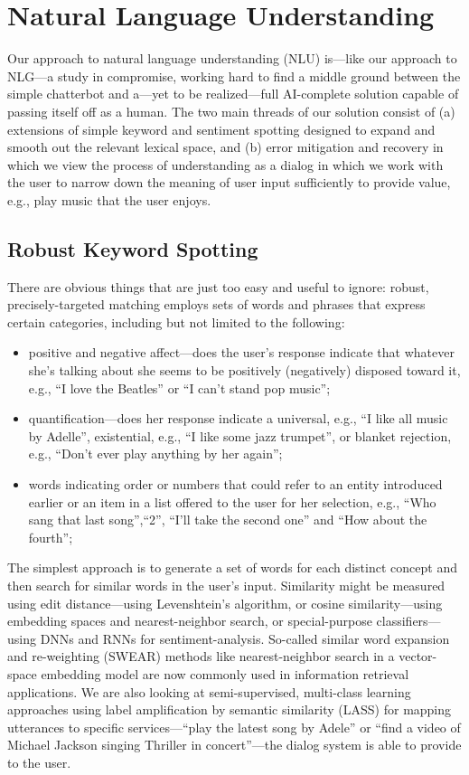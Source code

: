 \documentclass[letterpaper,11pt]{article}
\begin{document}
\section*{Natural Language Understanding}

Our approach to natural language understanding (NLU) is---like our approach to NLG---a study in compromise, working hard to find a middle ground between the simple chatterbot and a---yet to be realized---full AI-complete solution capable of passing itself off as a human. The two main threads of our solution consist of (a) extensions of simple keyword and sentiment spotting designed to expand and smooth out the relevant lexical space, and (b) error mitigation and recovery in which we view the process of understanding as a dialog in which we work with the user to narrow down the meaning of user input sufficiently to provide value, e.g., play music that the user enjoys.

\subsection*{Robust Keyword Spotting}

There are obvious things that are just too easy and useful to ignore: robust, precisely-targeted matching employs sets of words and phrases that express certain categories, including but not limited to the following:
%
\begin{itemize}
%
\item positive and negative affect---does the user's response indicate that whatever she's talking about she seems to be positively (negatively) disposed toward it, e.g., ``I love the Beatles'' or ``I can't stand pop music'';
%
\item quantification---does her response indicate a universal, e.g., ``I like all music by Adelle'', existential, e.g., ``I like some jazz trumpet'', or blanket rejection, e.g., ``Don't ever play anything by her again'';
%
\item words indicating order or numbers that could refer to an entity introduced earlier or an item in a list offered to the user for her selection, e.g., ``Who sang that last song'',``2'', ``I'll take the second one'' and ``How about the fourth'';
%
\end{itemize}
%
The simplest approach is to generate a set of words for each distinct concept and then search for similar words in the user's input. Similarity might be measured using edit distance---using Levenshtein's algorithm, or cosine similarity---using embedding spaces and nearest-neighbor search, or special-purpose classifiers---using DNNs and RNNs for sentiment-analysis. So-called similar word expansion and re-weighting (SWEAR) methods like nearest-neighbor search in a vector-space embedding model are now commonly used in information retrieval applications. We are also looking at semi-supervised, multi-class learning approaches using label amplification by semantic similarity (LASS) for mapping utterances to specific services---``play the latest song by Adele'' or ``find a video of Michael Jackson singing Thriller in concert''---the dialog system is able to provide to the user. 
\end{document}
